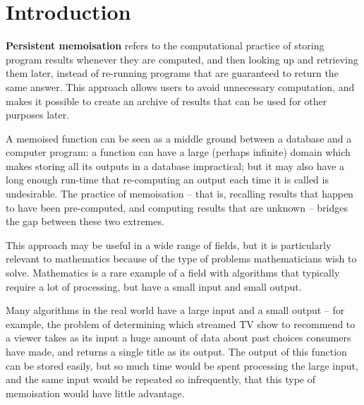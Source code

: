 \documentclass{deliverablereport}
\author{Michael Torpey}
\begin{document}
\maketitle
\githubissuedescription
\clearpage



\section{Introduction}
\label{sec:intro}

\textbf{Persistent memoisation} refers to the computational practice of storing
program results whenever they are computed, and then looking up and retrieving
them later, instead of re-running programs that are guaranteed to return the
same answer.  This approach allows users to avoid unnecessary computation, and
makes it possible to create an archive of results that can be used for other
purposes later.

A memoised function can be seen as a middle ground between a database and a
computer program: a function can have a large (perhaps infinite) domain which
makes storing all its outputs in a database impractical; but it may also have a
long enough run-time that re-computing an output each time it is called is
undesirable.  The practice of memoisation -- that is, recalling results that
happen to have been pre-computed, and computing results that are unknown --
bridges the gap between these two extremes.

This approach may be useful in a wide range of fields, but it is particularly
relevant to mathematics because of the type of problems mathematicians wish to
solve.  Mathematics is a rare example of a field with algorithms that typically
require a lot of processing, but have a small input and small output.

Many algorithms in the real world have a large input and a small output -- for
example, the problem of determining which streamed TV show to recommend to a
viewer takes as its input a huge amount of data about past choices consumers
have made, and returns a single title as its output.  The output of this
function can be stored easily, but so much time would be spent processing the
large input, and the same input would be repeated so infrequently, that this
type of memoisation would have little advantage.
\end{document}
